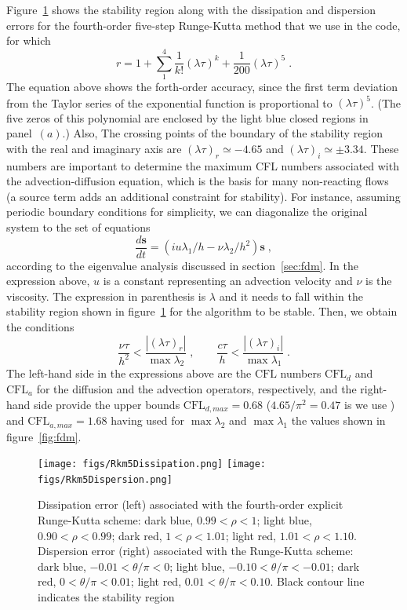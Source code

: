{Figure~\ref{fig:rkm} shows the stability region along with the dissipation and
dispersion errors for the fourth-order five-step Runge-Kutta method that we use
in the code, for which
\begin{equation}
  r=1+\sum_1^4\frac{1}{k!}(\lambda \tau)^k+\frac{1}{200}(\lambda \tau)^5 \;.
\end{equation}
The equation above shows the forth-order accuracy, since the first term
deviation from the Taylor series of the exponential function is proportional to
$(\lambda\tau)^5$. (The five zeros of this polynomial are enclosed by the light
blue closed regions in panel~$(a)$.) Also, The crossing points of the boundary
of the stability region with the real and imaginary axis are $(\lambda
\tau)_{r}\simeq-4.65$ and $(\lambda \tau)_{i}\simeq\pm 3.34$. These numbers are
important to determine the maximum CFL numbers associated with the
advection-diffusion equation, which is the basis for many non-reacting flows (a
source term adds an additional constraint for stability). For instance, assuming
periodic boundary conditions for simplicity, we can diagonalize the original
system to the set of equations
\begin{equation}
  \frac{d\mathbf{s}}{dt}=(iu\lambda_1/h -\nu\lambda_2/h^2)\mathbf{s} \;,
\end{equation}
according to the eigenvalue analysis discussed in section~\ref{sec:fdm}. In the
expression above, $u$ is a constant representing an advection velocity and $\nu$
is the viscosity.  The expression in parenthesis is $\lambda$ and it needs to
fall within the stability region shown in figure~\ref{fig:rkm} for the algorithm
to be stable. Then, we obtain the conditions
\begin{equation}
  \frac{\nu\tau}{h^2}<\frac{|(\lambda \tau)_{r}|}{\max{\lambda_2}}\;,\qquad
  \frac{c\tau}{h}<\frac{|(\lambda \tau)_{i}|}{\max{\lambda_1}} \;.
\end{equation}
The left-hand side in the expressions above are the $\textrm{CFL}$ numbers $\textrm{CFL}_d$
and $\textrm{CFL}_a$ for the diffusion and the advection operators,
respectively, and the right-hand side provide the upper bounds
$\textrm{CFL}_{d,max}=0.68$ ($4.65/\pi^2=0.47$ is we use \cite{Lamballais:2011}) and $\textrm{CFL}_{a,max}=1.68$ having used for
$\max{\lambda_2}$ and $\max{\lambda_1}$ the values shown in
figure~\ref{fig:fdm}.

\begin{figure}
\texttt{[image: figs/Rkm5Dissipation.png]}\hfill
\texttt{[image: figs/Rkm5Dispersion.png]}
\caption{Dissipation error (left) associated with the fourth-order explicit
  Runge-Kutta scheme: dark blue, $0.99<\rho<1$; light blue, $0.90<\rho<0.99$;
  dark red, $1<\rho<1.01$; light red, $1.01<\rho<1.10$. Dispersion error (right)
  associated with the Runge-Kutta scheme: dark blue, $-0.01<\theta/\pi<0$; light
  blue, $-0.10<\theta/\pi<-0.01$; dark red, $0<\theta/\pi<0.01$; light red,
  $0.01<\theta/\pi<0.10$. Black contour line indicates the stability
  region}\label{fig:rkm}
\end{figure}

}
